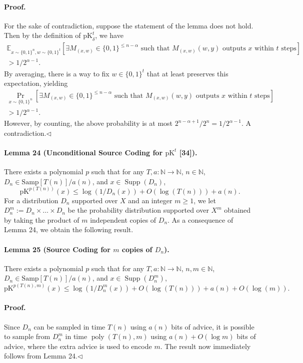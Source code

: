 \paragraph{Proof.} For the sake of contradiction, suppose the statement of the lemma does not hold. Then by the definition of $\mathrm{pK}_\delta^t$, we have
\begin{multline*}
\mathbb E_{x\sim\{0,1\}^n,w\sim\{0,1\}^t}[\exists M_{(x,w)}\in\{0,1\}^{\leq n-\alpha}\text{ such that }M_{(x,w)}(w,y)\text{ outputs }x\text{ within }t\text{ steps}]\\
>1/2^{\alpha-1}.
\end{multline*}
By averaging, there is a way to fix $w\in\{0,1\}^t$ that at least preserves this expectation, yielding
\begin{multline*}
\Pr_{x\sim\{0,1\}^n}[\exists M_{(x,w)}\in\{0,1\}^{\leq n-\alpha}\text{ such that }M_{(x,w)}(w,y)\text{ outputs }x\text{ within }t\text{ steps}]\\
>1/2^{\alpha-1}.
\end{multline*}
However, by counting, the above probability is at most $2^{n-\alpha+1}/2^n=1/2^{\alpha-1}$. A contradiction.\hfill$\triangleleft$
\paragraph{Lemma 24 (Unconditional Source Coding for $\mathrm{pK}^t$ [34]).} There exists a polynomial $p$ such that for any $T,a:\mathbb N\to\mathbb N$, $n\in\mathbb N$, $D_n\in\mathrm{Samp}[T(n)]/a(n)$, and $x\in\operatorname{Supp}(D_n)$,
\[\mathrm{pK}^{p(T(n))}(x)\leq\log(1/D_n(x))+O(\log(T(n)))+a(n).\]
For a distribution $D_n$ supported over $X$ and an integer $m\geq1$, we let $D_n^m:=D_n\times\ldots\times D_n$ be the probability distribution supported over $X^m$ obtained by taking the product of $m$ independent copies of $D_n$.
As a consequence of Lemma 24, we obtain the following result.
\paragraph{Lemma 25 (Source Coding for $m$ copies of $D_n$).} There exists a polynomial $p$ such that for any $T,a:\mathbb N\to\mathbb N$, $n,m\in\mathbb N$, $D_n\in\mathrm{Samp}[T(n)]/a(n)$, and $x\in\operatorname{Supp}(D_n^m)$,
\[\mathrm{pK}^{p(T(n),m)}(x)\leq\log(1/D_n^m(x))+O(\log(T(n)))+a(n)+O(\log(m)).\]
\paragraph{Proof.} Since $D_n$ can be sampled in time $T(n)$ using $a(n)$ bits of advice, it is possible to sample from $D_n^m$ in time $\operatorname{poly}(T(n),m)$ using $a(n)+O(\log m)$ bits of advice, where the extra advice is used to encode $m$. The result now immediately follows from Lemma 24.\hfill$\triangleleft$
